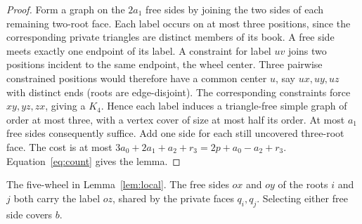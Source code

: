 \documentclass[11pt,a4paper]{article}
\begin{document}
\begin{proof}
Form a graph on the \(2a_1\) free sides by joining the two sides of each
remaining two-root face. Each label occurs on at most three positions,
since the corresponding private triangles are distinct members of its
book. A free side meets exactly one endpoint of its label. A constraint
for label \(uv\) joins two positions incident to the same endpoint, the
wheel center. Three pairwise constrained positions would
therefore have a common center \(u\), say \(ux,uy,uz\) with distinct ends
(roots are edge-disjoint). The corresponding constraints force \(xy,yz,zx\),
giving a \(K_4\). Hence each label induces a triangle-free simple graph of
order at most three, with a vertex cover of size at most half its order.
At most \(a_1\) free sides consequently suffice. Add one side for each still
uncovered three-root face. The cost is at most
\(3a_0+2a_1+a_2+r_3=2p+a_0-a_2+r_3\). Equation~\eqref{eq:count}
gives the lemma.
\end{proof}

\begin{center}
\begin{minipage}{.34\linewidth}\centering
{}
\end{minipage}\hspace{1em}%
\begin{minipage}{.54\linewidth}\small
The five-wheel in Lemma~\ref{lem:local}. The free sides \(ox\) and \(oy\)
of the roots \(i\) and \(j\) both carry the label \(oz\), shared by the
private faces \(q_i,q_j\). Selecting either free side covers \(b\).
\end{minipage}
\end{center}
\end{document}
